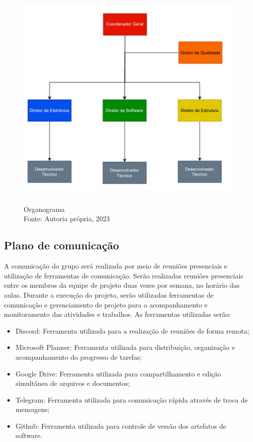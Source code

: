\begin{figure}[h!]
\centering
\includegraphics[width= 11.25cm, height=11.25cm]{figuras/Fig9.jpg}
\caption{Organograma \\ Fonte: Autoria própria, 2023}
\label{Fig9}
\end{figure}

\subsection{Plano de comunicação}
A comunicação do grupo será realizada por meio de reuniões presenciais e utilização de ferramentas de comunicação.
Serão realizadas reuniões presenciais entre os membros da equipe de projeto duas vezes por semana, no horário das aulas.
Durante a execução do projeto, serão utilizadas ferramentas de comunicação e gerenciamento de projeto para o acompanhamento e monitoramento das atividades e trabalhos. As ferramentas utilizadas serão:
\begin{itemize}
 \item Discord: Ferramenta utilizada para a realização de reuniões de forma remota; 
\item Microsoft Planner:  Ferramenta utilizada para distribuição, organização e acompanhamento do progresso de tarefas; 
\item Google Drive: Ferramenta utilizada para compartilhamento e edição simultânea de arquivos e documentos; 
\item Telegram: Ferramenta utilizada para comunicação rápida através de troca de mensagens;
\item Github: Ferramenta utilizada para controle de versão dos artefatos de software.

\end{itemize}
